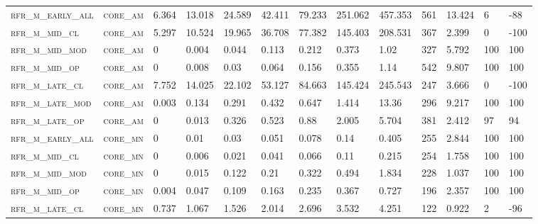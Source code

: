 \begin{landscape}
\begin{center}
\begin{footnotesize}
\begin{longtable}{lllllllllllll}
\textsc{rfr\_m\_early\_all} & \textsc{core\_am  }   & 6.364   & 13.018  & 24.589   & 42.411   & 79.233   & 251.062  & 457.353  & 561    & 13.424        & 6             & -88      \\
\textsc{rfr\_m\_mid\_cl   } & \textsc{core\_am  }   & 5.297   & 10.524  & 19.965   & 36.708   & 77.382   & 145.403  & 208.531  & 367    & 2.399         & 0             & -100     \\
\textsc{rfr\_m\_mid\_mod  } & \textsc{core\_am  }   & 0       & 0.004   & 0.044    & 0.113    & 0.212    & 0.373    & 1.02     & 327    & 5.792         & 100           & 100      \\
\textsc{rfr\_m\_mid\_op   } & \textsc{core\_am  }   & 0       & 0.008   & 0.03     & 0.064    & 0.156    & 0.355    & 1.14     & 542    & 9.807         & 100           & 100      \\
\textsc{rfr\_m\_late\_cl  } & \textsc{core\_am  }   & 7.752   & 14.025  & 22.102   & 53.127   & 84.663   & 145.424  & 245.543  & 247    & 3.666         & 0             & -100     \\
\textsc{rfr\_m\_late\_mod } & \textsc{core\_am  }   & 0.003   & 0.134   & 0.291    & 0.432    & 0.647    & 1.414    & 13.36    & 296    & 9.217         & 100           & 100      \\
\textsc{rfr\_m\_late\_op  } & \textsc{core\_am  }   & 0       & 0.013   & 0.326    & 0.523    & 0.88     & 2.005    & 5.704    & 381    & 2.412         & 97            & 94       \\
\textsc{rfr\_m\_early\_all} & \textsc{core\_mn  }   & 0       & 0.01    & 0.03     & 0.051    & 0.078    & 0.14     & 0.405    & 255    & 2.844         & 100           & 100      \\
\textsc{rfr\_m\_mid\_cl   } & \textsc{core\_mn  }   & 0       & 0.006   & 0.021    & 0.041    & 0.066    & 0.11     & 0.215    & 254    & 1.758         & 100           & 100      \\
\textsc{rfr\_m\_mid\_mod  } & \textsc{core\_mn  }   & 0       & 0.015   & 0.122    & 0.21     & 0.322    & 0.494    & 1.834    & 228    & 1.037         & 100           & 100      \\
\textsc{rfr\_m\_mid\_op   } & \textsc{core\_mn  }   & 0.004   & 0.047   & 0.109    & 0.163    & 0.235    & 0.367    & 0.727    & 196    & 2.357         & 100           & 100      \\
\textsc{rfr\_m\_late\_cl  } & \textsc{core\_mn  }   & 0.737   & 1.067   & 1.526    & 2.014    & 2.696    & 3.532    & 4.251    & 122    & 0.922         & 2             & -96      \\

\end{longtable}
\end{footnotesize}
\end{center}
\end{landscape}

